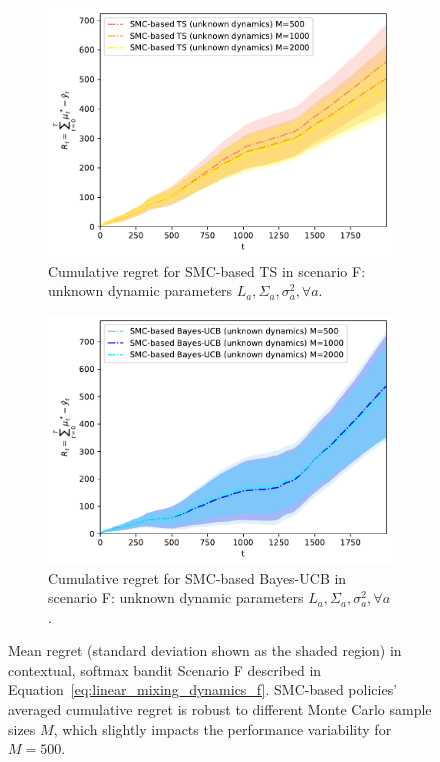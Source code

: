 \begin{figure}[!h]
\begin{subfigure}[b]{0.45\textwidth}
\includegraphics[width=\textwidth]{./fods_figs/dynamic/softmax/f_selectedM_cumulative_regret_dunknown_ts}
\caption{Cumulative regret for SMC-based TS in scenario F: unknown dynamic parameters $L_a,\Sigma_a,\sigma_a^2, \forall a$.}
\label{fig:dynamic_bandits_softmax_f_ts_dunknown_M}
\end{subfigure}\qquad
\begin{subfigure}[b]{0.45\textwidth}
\includegraphics[width=\textwidth]{./fods_figs/dynamic/softmax/f_selectedM_cumulative_regret_dunknown_bucb}
\caption{Cumulative regret for SMC-based Bayes-UCB in scenario F: unknown dynamic parameters $L_a,\Sigma_a,\sigma_a^2, \forall a$.}
\label{fig:dynamic_bandits_softmax_f_bucb_dunknown_M}
\end{subfigure}

\caption{
Mean regret (standard deviation shown as the shaded region) in contextual, softmax bandit Scenario F
described in Equation~\eqref{eq:linear_mixing_dynamics_f}.
SMC-based policies' averaged cumulative regret is robust to different Monte Carlo sample sizes $M$,
which slightly impacts the performance variability for $M=500$.
}
\label{fig:dynamic_bandits_softmax_f_M}
\end{figure}
